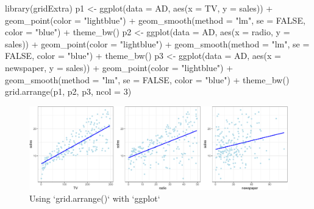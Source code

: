 \documentclass[
]{article}
\newenvironment{Shaded}{\begin{snugshade}}{\end{snugshade}}
\newcommand{\AttributeTok}[1]{\textcolor[rgb]{0.77,0.63,0.00}{#1}}
\newcommand{\ConstantTok}[1]{\textcolor[rgb]{0.00,0.00,0.00}{#1}}
\newcommand{\DecValTok}[1]{\textcolor[rgb]{0.00,0.00,0.81}{#1}}
\newcommand{\FunctionTok}[1]{\textcolor[rgb]{0.00,0.00,0.00}{#1}}
\newcommand{\NormalTok}[1]{#1}
\newcommand{\OtherTok}[1]{\textcolor[rgb]{0.56,0.35,0.01}{#1}}
\newcommand{\SpecialCharTok}[1]{\textcolor[rgb]{0.00,0.00,0.00}{#1}}
\newcommand{\StringTok}[1]{\textcolor[rgb]{0.31,0.60,0.02}{#1}}
\begin{document}
\begin{Shaded}
\begin{Highlighting}[]
\FunctionTok{library}\NormalTok{(gridExtra)}
\NormalTok{p1 }\OtherTok{\textless{}{-}} \FunctionTok{ggplot}\NormalTok{(}\AttributeTok{data =}\NormalTok{ AD, }\FunctionTok{aes}\NormalTok{(}\AttributeTok{x =}\NormalTok{ TV, }\AttributeTok{y =}\NormalTok{ sales)) }\SpecialCharTok{+}
        \FunctionTok{geom\_point}\NormalTok{(}\AttributeTok{color =} \StringTok{"lightblue"}\NormalTok{) }\SpecialCharTok{+} 
        \FunctionTok{geom\_smooth}\NormalTok{(}\AttributeTok{method =} \StringTok{"lm"}\NormalTok{, }\AttributeTok{se =} \ConstantTok{FALSE}\NormalTok{, }\AttributeTok{color =} \StringTok{"blue"}\NormalTok{) }\SpecialCharTok{+}
        \FunctionTok{theme\_bw}\NormalTok{()}
\NormalTok{p2 }\OtherTok{\textless{}{-}} \FunctionTok{ggplot}\NormalTok{(}\AttributeTok{data =}\NormalTok{ AD, }\FunctionTok{aes}\NormalTok{(}\AttributeTok{x =}\NormalTok{ radio, }\AttributeTok{y =}\NormalTok{ sales)) }\SpecialCharTok{+}
        \FunctionTok{geom\_point}\NormalTok{(}\AttributeTok{color =} \StringTok{"lightblue"}\NormalTok{) }\SpecialCharTok{+}
        \FunctionTok{geom\_smooth}\NormalTok{(}\AttributeTok{method =} \StringTok{"lm"}\NormalTok{, }\AttributeTok{se =} \ConstantTok{FALSE}\NormalTok{, }\AttributeTok{color =} \StringTok{"blue"}\NormalTok{) }\SpecialCharTok{+}
        \FunctionTok{theme\_bw}\NormalTok{()}
\NormalTok{p3 }\OtherTok{\textless{}{-}} \FunctionTok{ggplot}\NormalTok{(}\AttributeTok{data =}\NormalTok{ AD, }\FunctionTok{aes}\NormalTok{(}\AttributeTok{x =}\NormalTok{ newspaper, }\AttributeTok{y =}\NormalTok{ sales)) }\SpecialCharTok{+}
        \FunctionTok{geom\_point}\NormalTok{(}\AttributeTok{color =} \StringTok{"lightblue"}\NormalTok{) }\SpecialCharTok{+}
        \FunctionTok{geom\_smooth}\NormalTok{(}\AttributeTok{method =} \StringTok{"lm"}\NormalTok{, }\AttributeTok{se =} \ConstantTok{FALSE}\NormalTok{, }\AttributeTok{color =} \StringTok{"blue"}\NormalTok{) }\SpecialCharTok{+} 
        \FunctionTok{theme\_bw}\NormalTok{()}
\FunctionTok{grid.arrange}\NormalTok{(p1, p2, p3, }\AttributeTok{ncol =} \DecValTok{3}\NormalTok{)}
\end{Highlighting}
\end{Shaded}

\begin{figure}

{\centering \includegraphics{SDM-CHAP24_files/figure-latex/unnamed-chunk-1-1} 

}

\caption{Using `grid.arrange()` with `ggplot`}\label{fig:unnamed-chunk-1}
\end{figure}
\end{document}
